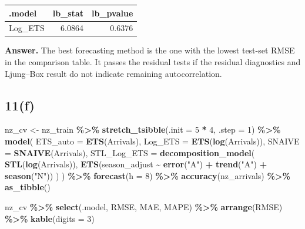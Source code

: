 \documentclass[
  11pt,
]{article}
\newenvironment{Shaded}{\begin{snugshade}}{\end{snugshade}}
\newcommand{\AttributeTok}[1]{\textcolor[rgb]{0.13,0.29,0.53}{#1}}
\newcommand{\DecValTok}[1]{\textcolor[rgb]{0.00,0.00,0.81}{#1}}
\newcommand{\FunctionTok}[1]{\textcolor[rgb]{0.13,0.29,0.53}{\textbf{#1}}}
\newcommand{\NormalTok}[1]{#1}
\newcommand{\OtherTok}[1]{\textcolor[rgb]{0.56,0.35,0.01}{#1}}
\newcommand{\SpecialCharTok}[1]{\textcolor[rgb]{0.81,0.36,0.00}{\textbf{#1}}}
\newcommand{\StringTok}[1]{\textcolor[rgb]{0.31,0.60,0.02}{#1}}
\newcounter{none} %
\begin{document}
{\def\LTcaptype{none} %
\begin{longtable}[]{@{}lrr@{}}
\toprule\noalign{}
.model & lb\_stat & lb\_pvalue \\
\midrule\noalign{}
\endhead
\bottomrule\noalign{}
\endlastfoot
Log\_ETS & 6.0864 & 0.6376 \\
\end{longtable}
}

\textbf{Answer.} The best forecasting method is the one with the lowest
test-set RMSE in the comparison table. It passes the residual tests if
the residual diagnostics and Ljung--Box result do not indicate remaining
autocorrelation.

\subsection{11(f)}\label{f-2}

\begin{Shaded}
\begin{Highlighting}[]
\NormalTok{nz\_cv }\OtherTok{\textless{}{-}}\NormalTok{ nz\_train }\SpecialCharTok{\%\textgreater{}\%}
  \FunctionTok{stretch\_tsibble}\NormalTok{(}\AttributeTok{.init =} \DecValTok{5} \SpecialCharTok{*} \DecValTok{4}\NormalTok{, }\AttributeTok{.step =} \DecValTok{1}\NormalTok{) }\SpecialCharTok{\%\textgreater{}\%}
  \FunctionTok{model}\NormalTok{(}
    \AttributeTok{ETS\_auto =} \FunctionTok{ETS}\NormalTok{(Arrivals),}
    \AttributeTok{Log\_ETS =} \FunctionTok{ETS}\NormalTok{(}\FunctionTok{log}\NormalTok{(Arrivals)),}
    \AttributeTok{SNAIVE =} \FunctionTok{SNAIVE}\NormalTok{(Arrivals),}
    \AttributeTok{STL\_Log\_ETS =} \FunctionTok{decomposition\_model}\NormalTok{(}
      \FunctionTok{STL}\NormalTok{(}\FunctionTok{log}\NormalTok{(Arrivals)),}
      \FunctionTok{ETS}\NormalTok{(season\_adjust }\SpecialCharTok{\textasciitilde{}} \FunctionTok{error}\NormalTok{(}\StringTok{"A"}\NormalTok{) }\SpecialCharTok{+} \FunctionTok{trend}\NormalTok{(}\StringTok{"A"}\NormalTok{) }\SpecialCharTok{+} \FunctionTok{season}\NormalTok{(}\StringTok{"N"}\NormalTok{))}
\NormalTok{    )}
\NormalTok{  ) }\SpecialCharTok{\%\textgreater{}\%}
  \FunctionTok{forecast}\NormalTok{(}\AttributeTok{h =} \DecValTok{8}\NormalTok{) }\SpecialCharTok{\%\textgreater{}\%}
  \FunctionTok{accuracy}\NormalTok{(nz\_arrivals) }\SpecialCharTok{\%\textgreater{}\%}
  \FunctionTok{as\_tibble}\NormalTok{()}

\NormalTok{nz\_cv }\SpecialCharTok{\%\textgreater{}\%}
  \FunctionTok{select}\NormalTok{(.model, RMSE, MAE, MAPE) }\SpecialCharTok{\%\textgreater{}\%}
  \FunctionTok{arrange}\NormalTok{(RMSE) }\SpecialCharTok{\%\textgreater{}\%}
  \FunctionTok{kable}\NormalTok{(}\AttributeTok{digits =} \DecValTok{3}\NormalTok{)}
\end{Highlighting}
\end{Shaded}
\end{document}
